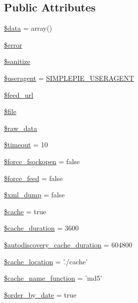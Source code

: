 \subsection*{Public Attributes}
\begin{DoxyCompactItemize}
\item 
\hyperlink{class_simple_pie_a6422da00e8fb85195da75105b021cdab}{\$data} = array()
\item 
\hyperlink{class_simple_pie_a4a21bcbc3310a990b5dd0d5d1b50038a}{\$error}
\item 
\hyperlink{class_simple_pie_a30ff6078e92c9d939a2ac529950f17cb}{\$sanitize}
\item 
\hyperlink{class_simple_pie_ac5d98675096aaa26750b64d4ff22c721}{\$useragent} = \hyperlink{simplepie_8inc_aa16b1a92eba4943f883b1f958edba8ef}{S\-I\-M\-P\-L\-E\-P\-I\-E\-\_\-\-U\-S\-E\-R\-A\-G\-E\-N\-T}
\item 
\hyperlink{class_simple_pie_af6a3b4cd93e72ad875dcd89a80741a54}{\$feed\-\_\-url}
\item 
\hyperlink{class_simple_pie_ac3fad6fb38af67c733f3ef68365e3ff2}{\$file}
\item 
\hyperlink{class_simple_pie_a0cbbc5572426f35b5a3b11bd4f4d2303}{\$raw\-\_\-data}
\item 
\hyperlink{class_simple_pie_a91f3b8c4a288715f41fff05e23c221ff}{\$timeout} = 10
\item 
\hyperlink{class_simple_pie_aaf4a3e2440c66afa4dde5f555c175ff2}{\$force\-\_\-fsockopen} = false
\item 
\hyperlink{class_simple_pie_a8f9c66503c69e0682c5464b3af25629c}{\$force\-\_\-feed} = false
\item 
\hyperlink{class_simple_pie_af8f83cf420d4339130d0a5af30edd90f}{\$xml\-\_\-dump} = false
\item 
\hyperlink{class_simple_pie_a91d547c8dfee2257694759bb9306d6b6}{\$cache} = true
\item 
\hyperlink{class_simple_pie_a799c1d8f21436c28951e18778756e641}{\$cache\-\_\-duration} = 3600
\item 
\hyperlink{class_simple_pie_adb913d0675f05ed6d6a6ba988ba6c1b1}{\$autodiscovery\-\_\-cache\-\_\-duration} = 604800
\item 
\hyperlink{class_simple_pie_af70fc18e7315d5fd30ade313342fdf86}{\$cache\-\_\-location} = './cache'
\item 
\hyperlink{class_simple_pie_a43666616ee3cd407a3afc996053f27fb}{\$cache\-\_\-name\-\_\-function} = 'md5'
\item 
\hyperlink{class_simple_pie_a7f064ce975d7283d6d1a6c6aa4a43a1c}{\$order\-\_\-by\-\_\-date} = true

\end{DoxyCompactItemize}
